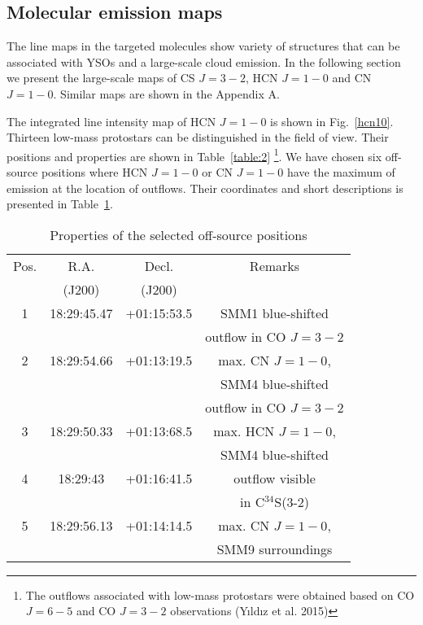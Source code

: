 \documentclass{aa}
\begin{document}
\subsection{Molecular emission maps}

The line maps in the targeted molecules show variety of structures that can be associated with YSOs and a large-scale cloud emission. In the following section we present the large-scale maps of CS $J=3-2$, HCN $J=1-0$ and CN $J=1-0$. Similar maps are shown in the Appendix A.

The integrated line intensity map of HCN $J=1-0$ is shown in Fig.~\ref{hcn10}. 
Thirteen low-mass protostars can be distinguished in the field of view. Their positions and properties are shown in Table~\ref{table:2} \footnote{The outflows associated with low-mass protostars were obtained based on CO $J=6-5$ and CO $J=3-2$ observations (Y{\i}ld{\i}z et al. 2015)}. We have chosen six off-source positions where HCN $J=1-0$ or CN $J=1-0$ have the maximum of emission at the location of outflows. Their coordinates and short descriptions is presented in Table~\ref{table:3}.



\begin{table}
\caption{Properties of the selected off-source positions}             %
\label{table:3}      %
\centering                          %
\begin{tabular}{c c c c} 
\hline\hline 
Pos. & R.A. & Decl. & Remarks\\
 & (J200) & (J200) & \\
\hline
1 & 18:29:45.47 & +01:15:53.5 & SMM1 blue-shifted \\
 & & & outflow in CO $J=3-2$\\
\hline
2 & 18:29:54.66 & +01:13:19.5 & max. CN $J=1-0$, \\
 & & & SMM4 blue-shifted \\
 & & & outflow in CO $J=3-2$\\
\hline
3 & 18:29:50.33 & +01:13:68.5 & max. HCN $J=1-0$, \\
 & & & SMM4 blue-shifted \\
\hline
4 & 18:29:43 & +01:16:41.5 & outflow visible \\
 & & &  in C$^{34}$S(3-2)\\
\hline
5 & 18:29:56.13 & +01:14:14.5 & max. CN $J=1-0$, \\
 & & & SMM9 surroundings\\
\hline
\end{tabular}
\end{table}
\end{document}
